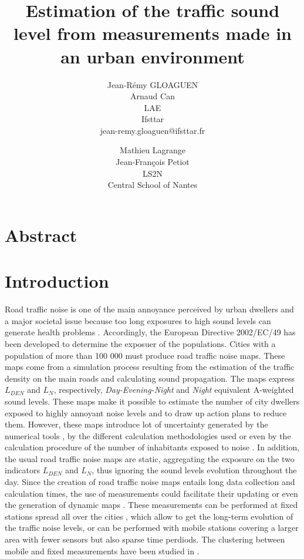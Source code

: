 \documentclass[twocolumn,a4paper,10pt]{article}
\title{Estimation of the traffic sound level from measurements made in an urban environment}
\author{
    Jean-Rémy GLOAGUEN\\
    Arnaud Can\\
    LAE\\
    Ifsttar\\
    jean-remy.gloaguen@ifsttar.fr
  \and
    Mathieu Lagrange\\
	Jean-François Petiot \\
    LS2N\\
    Central School of Nantes\\
}
\date{}
\begin{document}
\maketitle

\section*{Abstract}

\section{Introduction}

Road traffic noise is one of the main annoyance perceived by urban dwellers and a major societal issue because too long exposures to high sound levels can generate health problems  \cite{who_burden_2017}.  Accordingly, the European Directive 2002/EC/49 \cite{directive} has been developed to determine the exposuer of the populations. Cities with a population of more than 100 000 must produce road traffic noise maps. These maps come from a simulation process resulting from the estimation of the traffic density on the main roads and calculating sound propagation. The maps express $L_ {DEN}$ and $L_N$, respectively, \textit{Day-Evening-Night} and \textit{Night} equivalent A-weighted sound levels. These maps make it possible to estimate the number of city dwellers exposed to highly annoyant noise levels and to draw up action plans to reduce them. However, these maps introduce lot of uncertainty generated by the numerical tools \cite{van_leeuwen_noise_2015}, by the different calculation methodologies used \cite{leroy_uncertainty_2010}\cite{garg_critical_2014} or even by the calculation procedure of the number of inhabitants exposed to noise \cite{king_implementation_2011}. In addition, the usual road traffic noise maps are static, aggregating the exposure on the two indicators $L_{DEN}$ and $L_N$, thus ignoring the sound levels evolution throughout the day. Since the creation of road traffic noise maps entails long data collection and calculation times, the use of measurements could facilitate their updating or even the generation of dynamic maps \cite{wei_dynamic_2016}. These measurements can be performed at fixed stations spread all over the cities \cite{Mioduszewski} \cite{mietlicki2012innovative}, which allow to get the long-term evolution of the traffic noise levels, or can be performed with  mobile stations \cite{can_exploring_2012} \cite{manvell2004sadmam} covering a larger area with fewer sensors but also sparse time perdiods. The clustering between mobile and fixed measurements have been studied in \cite{can_measurement_2014}.
\end{document}
